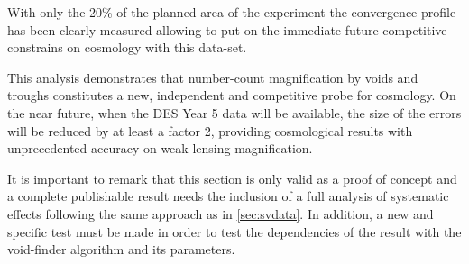 With only the 20\% of the planned area of the experiment the convergence profile has been clearly measured allowing to put on the immediate future competitive constrains on cosmology with this data-set.
\newline

This analysis demonstrates that number-count magnification by voids and troughs constitutes a new, independent and competitive probe for cosmology. On the near future, when the DES Year 5 data will be available, the size of the errors will be reduced by at least a factor 2, providing cosmological results with unprecedented accuracy on weak-lensing magnification.
\newline

It is important to remark that this section is only valid as a proof of concept and a complete publishable result needs the inclusion of a full analysis of systematic effects following the same approach as in \autoref{sec:svdata}. In addition, a new and specific test must be made in order to test the dependencies of the result with the void-finder algorithm and its parameters.
